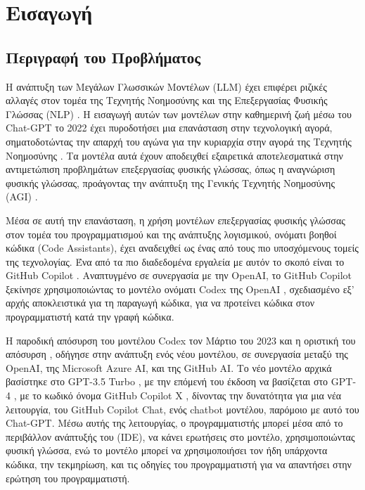 \chapter{Εισαγωγή}
\label{ch:chapter1}

\section{Περιγραφή του Προβλήματος}
Η ανάπτυξη των Μεγάλων Γλωσσικών Μοντέλων \textlatin{(LLM)} έχει
επιφέρει ριζικές αλλαγές στον τομέα της Τεχνητής Νοημοσύνης και της
Επεξεργασίας Φυσικής Γλώσσας \textlatin{(NLP)}
\cite{bommasani2021opportunities,zhao2023survey,zhou2023comprehensive,jurafsky2009speech}.
Η εισαγωγή αυτών των μοντέλων στην καθημερινή ζωή μέσω του
\textlatin{Chat-GPT} το 2022 \cite{openai2022chatgpt} έχει πυροδοτήσει
μια επανάσταση στην τεχνολογική αγορά, σηματοδοτώντας την απαρχή του
αγώνα για την κυριαρχία στην αγορά της Τεχνητής Νοημοσύνης
\cite{guardian2024openai,nyt2024openai,verge2023chatgpt,liu2023chatgpt,trendforce2023ai}.
Τα μοντέλα αυτά έχουν αποδειχθεί εξαιρετικά αποτελεσματικά στην
αντιμετώπιση προβλημάτων επεξεργασίας φυσικής γλώσσας, όπως η αναγνώριση
φυσικής γλώσσας, προάγοντας την ανάπτυξη της Γενικής Τεχνητής Νοημοσύνης
\textlatin{(AGI)} \cite{adams2012mapping,goertzel2014agi}.

Μέσα σε αυτή την επανάσταση, η χρήση μοντέλων επεξεργασίας φυσικής
γλώσσας στον τομέα του προγραμματισμού και της ανάπτυξης λογισμικού,
ονόματι βοηθοί κώδικα \textlatin{(Code Assistants)}, έχει αναδειχθεί ως
ένας από τους πιο υποσχόμενους τομείς της τεχνολογίας. Ένα από τα πιο
διαδεδομένα εργαλεία με αυτόν το σκοπό είναι το \textlatin{GitHub
Copilot} \cite{github2021copilot,githubcopilot}. Αναπτυγμένο σε
συνεργασία με την \textlatin{OpenAI}, το \textlatin{GitHub Copilot}
ξεκίνησε χρησιμοποιώντας το μοντέλο ονόματι \textlatin{Codex} της
\textlatin{OpenAI} \cite{chen2021evaluating}, σχεδιασμένο εξ' αρχής
αποκλειστικά για τη παραγωγή κώδικα, για να προτείνει κώδικα στον
προγραμματιστή κατά την γραφή κώδικα.

Η παροδική απόσυρση του μοντέλου \textlatin{Codex} τον Μάρτιο του 2023
και η οριστική του απόσυρση  \cite{kemper2023openai}, οδήγησε
στην ανάπτυξη ενός νέου μοντέλου, σε συνεργασία μεταξύ της
\textlatin{OpenAI}, της \textlatin{Microsoft Azure AI}, και της
\textlatin{GitHub AI}. Το νέο μοντέλο αρχικά βασίστηκε στο
\textlatin{GPT-3.5 Turbo} \cite{github2023copilotupdate}, με την επόμενή
του έκδοση να βασίζεται στο \textlatin{GPT-4}
\cite{github2023copilotupdate}, με το κωδικό όνομα \textlatin{GitHub
Copilot X} \cite{github2023copilotx}, δίνοντας την δυνατότητα για μια
νέα λειτουργία, του \textlatin{GitHub Copilot Chat}, ενός
\textlatin{chatbot} μοντέλου, παρόμοιο με αυτό του \textlatin{Chat-GPT}.
Μέσω αυτής της λειτουργίας, ο προγραμματιστής μπορεί μέσα από το
περιβάλλον ανάπτυξής του \textlatin{(IDE)}, να κάνει ερωτήσεις στο
μοντέλο, χρησιμοποιώντας φυσική γλώσσα, ενώ το μοντέλο μπορεί να
χρησιμοποιήσει τον ήδη υπάρχοντα κώδικα, την τεκμηρίωση, και τις οδηγίες
του προγραμματιστή για να απαντήσει στην ερώτηση του προγραμματιστή.

